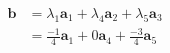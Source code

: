 \documentclass[preview]{standalone}
\renewcommand{\vec}{\mathbf}
\begin{document}
\begin{center}
\begin{align*}\vec{b}&=\lambda_1\vec{a}_1+\lambda_4\vec{a}_2+\lambda_5\vec{a}_3\\&=\frac{-1}{4}\vec{a}_1+0\vec{a}_4+\frac{-3}{4}\vec{a}_5\end{align*}
\end{center}
\end{document}
